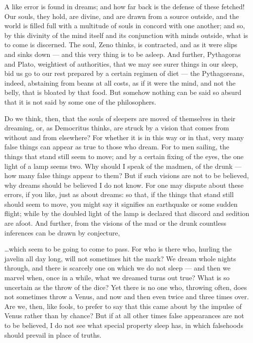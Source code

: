  A like error is found in dreams; and how far back is the defense of these fetched! Our souls, they hold, are divine, and are drawn from a source outside, and the world is filled full with a multitude of souls in concord with one another; and so, by this divinity of the mind itself and its conjunction with minds outside, what is to come is discerned. The soul, Zeno thinks, is contracted, and as it were slips and sinks down — and this very thing is to be asleep. And further, Pythagoras and Plato, weightiest of authorities, that we may see surer things in our sleep, bid us go to our rest prepared by a certain regimen of diet — the Pythagoreans, indeed, abstaining from beans at all costs, as if it were the mind, and not the belly, that is bloated by that food. But somehow nothing can be said so absurd that it is not said by some one of the philosophers.

 Do we think, then, that the souls of sleepers are moved of themselves in their dreaming, or, as Democritus thinks, are struck by a vision that comes from without and from elsewhere? For whether it is in this way or in that, very many false things can appear as true to those who dream. For to men sailing, the things that stand still seem to move; and by a certain fixing of the eyes, the one light of a lamp seems two. Why should I speak of the madmen, of the drunk — how many false things appear to them? But if such visions are not to be believed, why dreams should be believed I do not know. For one may dispute about these errors, if you like, just as about dreams: so that, if the things that stand still should seem to move, you might say it signifies an earthquake or some sudden flight; while by the doubled light of the lamp is declared that discord and sedition are afoot. And further, from the visions of the mad or the drunk countless inferences can be drawn by conjecture,

 \dots which seem to be going to come to pass. For who is there who, hurling the javelin all day long, will not sometimes hit the mark? We dream whole nights through, and there is scarcely one on which we do not sleep — and then we marvel when, once in a while, what we dreamed turns out true? What is so uncertain as the throw of the dice? Yet there is no one who, throwing often, does not sometimes throw a Venus, and now and then even twice and three times over. Are we, then, like fools, to prefer to say that this came about by the impulse of Venus rather than by chance? But if at all other times false appearances are not to be believed, I do not see what special property sleep has, in which falsehoods should prevail in place of truths.

